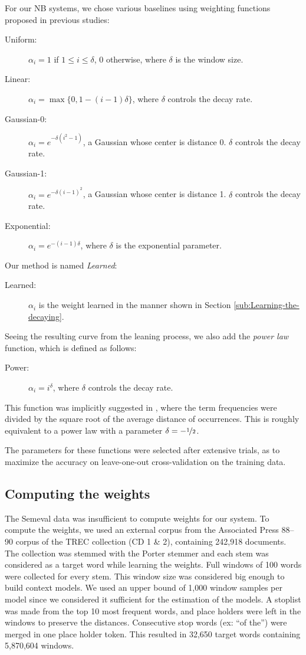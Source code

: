 \documentclass[english]{jnlp_1.4}
\begin{document}
For our NB systems, we chose various baselines using weighting functions
proposed in previous studies:
\begin{description}
\item [{Uniform:}] $\alpha_{i}=1$ if $1\leq i\leq\delta$, 0 otherwise,
where $\delta$ is the window size.
\item [{Linear:}] $\alpha_{i}=\max\{0,1-(i-1)\delta\}$, where $\delta$
controls the decay rate.
\item [{Gaussian-0:}] $\alpha_{i}=e^{-\delta\left(i^{2}-1\right)}$, a
Gaussian whose center is distance 0. $\delta$ controls the decay
rate.
\item [{Gaussian-1:}] $\alpha_{i}=e^{-\delta(i-1)^{2}}$, a Gaussian whose
center is distance 1. $\delta$ controls the decay rate.
\item [{Exponential:}] $\alpha_{i}=e^{-(i-1)\delta}$, where $\delta$
is the exponential parameter.
\end{description}
Our method is named \emph{Learned}:
\begin{description}
\item [{Learned:}] $\alpha_{i}$ is the weight learned in the manner shown
in Section \ref{sub:Learning-the-decaying}.
\end{description}
Seeing the resulting curve from the leaning process, we also add the
\emph{power law} function, which is defined as follows:
\begin{description}
\item [{Power:}] $\alpha_{i}=i^{\delta}$, where $\delta$ controls the
decay rate. 
\end{description}
This function was implicitly suggested in \cite{OhChoiWsdStaticDynamicVector},
where the term frequencies were divided by the square root of the
average distance of occurrences. This is roughly equivalent to a power
law with a parameter $\delta=-\nicefrac{1}{2}$.

The parameters for these functions were selected after extensive trials,
as to maximize the accuracy on leave-one-out cross-validation on the
training data.


\subsection{Computing the weights}
\label{sub:Computing-weights-ELS}

The Semeval data was insufficient to compute weights for our system.
To compute the weights, we used an external corpus from the Associated
Press 88--90 corpus of the TREC collection (CD 1 \& 2), containing
242,918 documents. The collection was stemmed with the Porter stemmer
and each stem was considered as a target word while learning the weights.
Full windows of 100 words were collected for every stem. This window
size was considered big enough to build context models. We used an
upper bound of 1,000 window samples per model since we considered it
sufficient for the estimation of the models. A stoplist was made from
the top 10 most frequent words, and place holders were left in the
windows to preserve the distances. Consecutive stop words (ex: {}``of
the'') were merged in one place holder token. This resulted in 32,650
target words containing 5,870,604 windows. 
\end{document}
